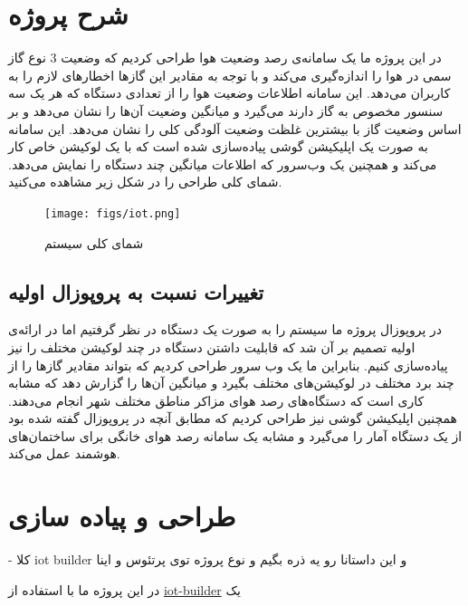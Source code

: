 \section{شرح پروژه}
در این پروژه ما یک سامانه‌ی 
رصد وضعیت هوا طراحی کردیم که وضعیت 3 نوع گاز سمی در هوا را اندازه‌‌گیری می‌کند و با توجه به مقادیر این گاز‌ها اخطار‌های لازم را به کاربران می‌دهد. این سامانه اطلاعات وضعیت هوا را از تعدادی دستگاه که هر یک سه سنسور مخصوص به گاز ‌دارند می‌گیرد و میانگین وضعیت آن‌ها را نشان می‌دهد و بر اساس وضعیت گاز با بیشترین غلظت وضعیت آلودگی کلی را نشان می‌دهد. این سامانه به صورت یک اپلیکیشن گوشی پیاده‌سازی شده است که با یک لوکیشن خاص کار می‌کند و همچنین یک وب‌سرور که اطلاعات میانگین چند دستگاه را نمایش می‌دهد. شمای کلی طراحی را در شکل زیر مشاهده می‌کنید. 
\begin{figure}[h!]
	\centering		
	\texttt{[image: figs/iot.png]}
	\caption{شمای کلی سیستم}
\end{figure}


\subsection{تغییرات نسبت به پروپوزال اولیه}
در پروپوزال پروژه ما سیستم را به صورت یک دستگاه در نظر گرفتیم اما در ارائه‌ی اولیه تصمیم بر آن شد که قابلیت داشتن دستگاه در چند لوکیشن مختلف را نیز پیاده‌سازی کنیم. بنابراین ما یک وب سرور طراحی کردیم که بتواند مقادیر گاز‌ها را از چند برد مختلف در لوکیشن‌های مختلف بگیرد و میانگین آن‌ها را گزارش دهد که مشابه کاری است که دستگاه‌های رصد هوای مزاکر مناطق مختلف شهر انجام می‌دهند. همچنین اپلیکیشن گوشی نیز طراحی کردیم که مطابق آنچه در پروپوزال گفته شده بود از یک دستگاه آمار را می‌گیرد و مشابه یک سامانه رصد هوای خانگی برای ساختمان‌های هوشمند عمل می‌کند.  

\section{طراحی و پیاده سازی}
- کلا iot builder و این داستانا رو یه ذره بگیم و نوع پروژه توی پرتئوس و اینا

در این پروژه ما با استفاده از 
\href{https://labcenter.s3.amazonaws.com/downloads/iotHelp.pdf}{iot-builder}
یک 
